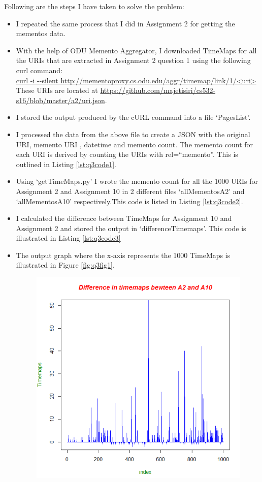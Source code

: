 Following are the steps I have taken to solve the problem:
\begin{itemize}
\item I repeated the same process that I did in Assignment 2 for getting the mementos data.
\item With the help of ODU Memento Aggregator, I downloaded TimeMaps for all the URIs that are extracted in Assignment 2 question 1 using the following curl command:\\
{\url {curl -i --silent http://mementoproxy.cs.odu.edu/aggr/timemap/link/1/<uri>}}\\
These URIs are located at \url{https://github.com/majetisiri/cs532-s16/blob/master/a2/uri.json}.
\item  I stored the output produced by the cURL command into a file `PagesList'. 
\item I processed the data from the above file to create a JSON with the original URI, memento URI , datetime and memento count. The memento count for each URI is derived by counting the URIs with rel=``memento''. This is outlined in Listing \ref{lst:q3code1}.
\item Using `getTimeMaps.py' I wrote the memento count for all the 1000 URIs for Assignment 2 and Assignment 10 in 2 different files `allMementosA2' and `allMementosA10' respectively.This code is listed in Listing \ref{lst:q3code2}.
\item I calculated the difference between TimeMaps for Assignment 10 and Assignment 2 and stored the output in `differenceTimemaps'. This code is illustrated in Listing \ref{lst:q3code3}
\item The output graph where the x-axis represents the 1000 TimeMaps is illustrated in Figure \ref{fig:q3fig1}. 
\begin{figure}[h!]
\begin{center}
\hspace*{-3cm} 
\includegraphics[scale=0.55, keepaspectratio=true]{figures/1.PNG}

\end{center}
\end{figure}
\end{itemize}
